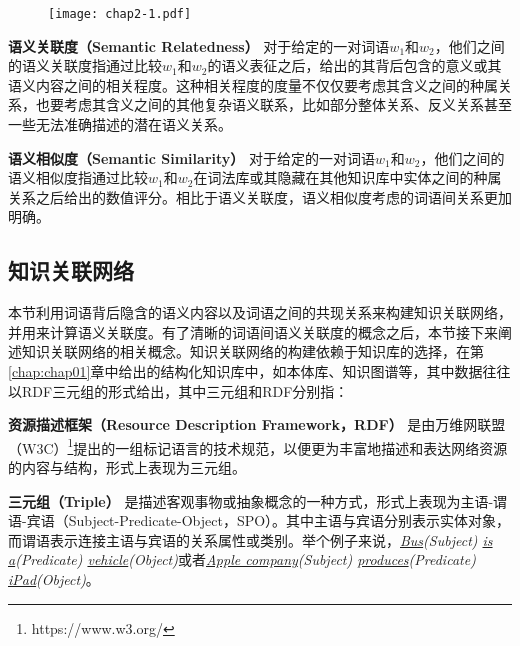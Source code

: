 \begin{figure}[!htb]
    \centerline{\texttt{[image: chap2-1.pdf]}}
    \label{chap2-1}
\end{figure}

\begin{definition}
    \label{sr}
    {\bf 语义关联度（Semantic Relatedness）}
    对于给定的一对词语$w_1$和$w_2$，他们之间的语义关联度指通过比较$w_1$和$w_2$的语义表征之后，给出的其背后包含的意义或其语义内容之间的相关程度。这种相关程度的度量不仅仅要考虑其含义之间的种属关系，也要考虑其含义之间的其他复杂语义联系，比如部分整体关系、反义关系甚至一些无法准确描述的潜在语义关系。
\end{definition}

\begin{definition}
    \label{ss}
    {\bf 语义相似度（Semantic Similarity）}
    对于给定的一对词语$w_1$和$w_2$，他们之间的语义相似度指通过比较$w_1$和$w_2$在词法库或其隐藏在其他知识库中实体之间的种属关系之后给出的数值评分。相比于语义关联度，语义相似度考虑的词语间关系更加明确。
\end{definition}

\subsection{知识关联网络}
本节利用词语背后隐含的语义内容以及词语之间的共现关系来构建知识关联网络，并用来计算语义关联度。有了清晰的词语间语义关联度的概念之后，本节接下来阐述知识关联网络的相关概念。知识关联网络的构建依赖于知识库的选择，在第\ref{chap:chap01}章中给出的结构化知识库中，如本体库、知识图谱等，其中数据往往以RDF三元组的形式给出，其中三元组和RDF分别指：

\begin{definition}
    \label{rdf}
    {\bf 资源描述框架（Resource Description Framework，RDF）}
    是由万维网联盟（W3C）\footnote{https://www.w3.org/}提出的一组标记语言的技术规范，以便更为丰富地描述和表达网络资源的内容与结构，形式上表现为三元组。
\end{definition}

\begin{definition}
    \label{triple}
    {\bf 三元组（Triple）}
    是描述客观事物或抽象概念的一种方式，形式上表现为主语-谓语-宾语（Subject-Predicate-Object，SPO）。其中主语与宾语分别表示实体对象，而谓语表示连接主语与宾语的关系属性或类别。举个例子来说，\emph{\underline{Bus}(Subject) \underline{is a}(Predicate) \underline{vehicle}(Object)}或者\emph{\underline{Apple company}(Subject) \underline{produces}(Predicate) \underline{iPad}(Object)}。
\end{definition}

